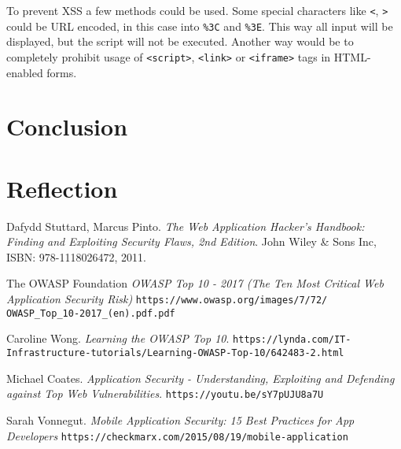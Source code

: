 \documentclass[a4paper]{article}
\begin{document}
To prevent XSS a few methods could be used. Some special characters like
\texttt{<}, \texttt{>} could be URL encoded, in this case into \texttt{\%3C} and
\texttt{\%3E}. This way all input will be displayed, but the script will not be
executed. Another way would be to completely prohibit usage of
\texttt{<script>}, \texttt{<link>} or \texttt{<iframe>} tags in HTML-enabled
forms.

\newpage

\section{Conclusion}

\section{Reflection}

\newpage

\begin{thebibliography}{9}


		Dafydd Stuttard, Marcus Pinto.
		\textit{The Web Application Hacker's Handbook: Finding and
		Exploiting Security Flaws, 2nd Edition}.
		John Wiley \& Sons Inc, ISBN: 978-1118026472, 2011.

		The OWASP Foundation
		\textit{OWASP Top 10 - 2017 (The Ten Most Critical Web
		Application Security Risk)}
		\texttt{https://www.owasp.org/images/7/72/
		OWASP\_Top\_10-2017\_(en).pdf.pdf}

		Caroline Wong.
		\textit{Learning the OWASP Top 10}.
		\texttt{https://lynda.com/IT-\allowbreak{}
		Infrastructure-tutorials/Learning-OWASP-Top-10/642483-2.html}
		
		Michael Coates.
		\textit{Application Security - Understanding, Exploiting and
		Defending against Top Web Vulnerabilities}.
		\texttt{https://youtu.be/sY7pUJU8a7U}

		Sarah Vonnegut.
		\textit{Mobile Application Security: 15 Best Practices for App
		Developers}
		\texttt{https://checkmarx.com/2015/08/19/mobile-application}

\end{thebibliography}
\end{document}
